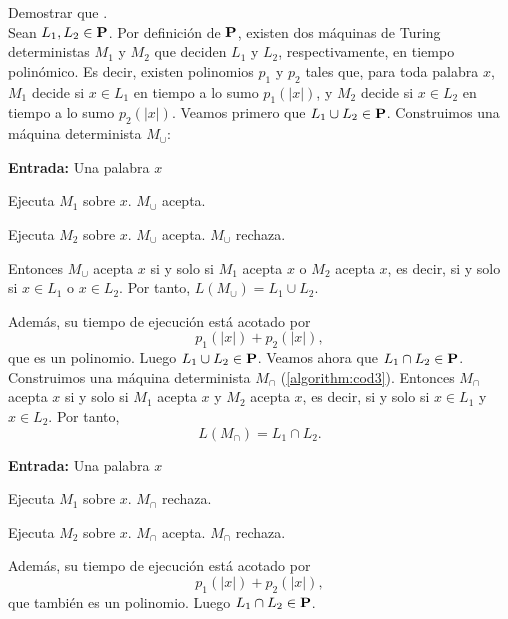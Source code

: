 \begin{ejercicio}
    Demostrar que \Pol {}. \\

    Sean $L_1,L_2 \in \textbf{P}$. Por definición de $\textbf{P}$, existen dos máquinas de Turing deterministas
    $M_1$ y $M_2$ que deciden $L_1$ y $L_2$, respectivamente, en tiempo polinómico. Es decir, existen polinomios $p_1$ y $p_2$ tales que, para toda palabra $x$,
    $M_1$ decide si $x \in L_1$ en tiempo a lo sumo $p_1(|x|)$, y $M_2$ decide si $x \in L_2$ en tiempo a lo sumo $p_2(|x|)$. Veamos primero que 
    $L_1 \cup L_2 \in \textbf{P}$. Construimos una máquina determinista $M_{\cup}$:

    \begin{algorithm}
    \caption{MT $M_{\cup}$}
    \begin{algorithmic}
        \State \textbf{Entrada:} Una palabra $x$

        \State Ejecuta $M_1$ sobre $x$.
            \State $M_{\cup}$ acepta.
        \EndIf

        \State Ejecuta $M_2$ sobre $x$.
            \State $M_{\cup}$ acepta.
        \Else
            \State $M_{\cup}$ rechaza.
        \EndIf
    \end{algorithmic}
    \end{algorithm}

    Entonces $M_{\cup}$ acepta $x$ si y solo si $M_1$ acepta $x$ o $M_2$ acepta $x$, es decir,
    si y solo si $x \in L_1$ o $x \in L_2$. Por tanto, $L(M_{\cup}) = L_1 \cup L_2.$

    Además, su tiempo de ejecución está acotado por
    $$
    p_1(|x|) + p_2(|x|),
    $$
    que es un polinomio. Luego $L_1 \cup L_2 \in \textbf{P}$. Veamos ahora que $L_1 \cap L_2 \in \textbf{P}$. Construimos una máquina determinista $M_{\cap}$
    (\ref{algorithm:cod3}). Entonces $M_{\cap}$ acepta $x$ si y solo si $M_1$ acepta $x$ y $M_2$ acepta $x$, es decir,
    si y solo si $x \in L_1$ y $x \in L_2$. Por tanto,
    $$
    L(M_{\cap}) = L_1 \cap L_2.
    $$

    \begin{algorithm}
    \caption{MT $M_{\cap}$}
    \begin{algorithmic}
        \State \textbf{Entrada:} Una palabra $x$

        \State Ejecuta $M_1$ sobre $x$.
            \State $M_{\cap}$ rechaza.
        \EndIf

        \State Ejecuta $M_2$ sobre $x$.
            \State $M_{\cap}$ acepta.
        \Else
            \State $M_{\cap}$ rechaza.
        \EndIf
    \end{algorithmic}
    \label{algorithm:cod3}
    \end{algorithm}



    Además, su tiempo de ejecución está acotado por
    $$
    p_1(|x|) + p_2(|x|),
    $$
    que también es un polinomio. Luego $L_1 \cap L_2 \in \textbf{P}$.
\end{ejercicio}



